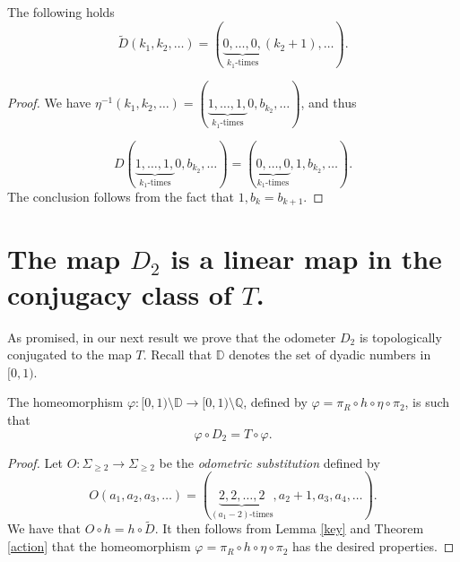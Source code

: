 \documentclass[letterpaper,10pt,reqno]{amsart}
\numberwithin{equation}{section}     %
\def\phi{\varphi}
\def\Q{{\mathbb Q}}
\begin{document}
 \begin{lemma}  \label{key}
 The following holds
 \begin{equation}
\tilde{D}(k_1, k_2,  \dots)=(\underbrace{0,\dots,0,}_{k_1\textrm{-times}}(k_2+1), \dots).
 \end{equation}
  \end{lemma}
\begin{proof}
We have $\eta^{-1}(k_1, k_2, \dots)=(\underbrace{1,\dots, 1,}_{k_1\textrm{-times}}0, b_{k_2}, \dots)$, and thus 

\[
D\left(\underbrace{1,\dots, 1,}_{k_1\textrm{-times}}0, b_{k_2},\dots \right)=\left( \underbrace{0,\dots, 0}_{k_1\textrm{-times}},1,b_{k_2},\dots\right).
\]
The conclusion follows from the fact that $1, b_k=b_{k+1}$.
\end{proof}






 
 
 
 
\section{The map $D_2$ is a linear map in the conjugacy class of $T$.} \label{sec:conj}


As promised, in our next result we prove that the odometer $D_2$ is topologically conjugated to the map $T$.
Recall that  $\mathbb{D}$ denotes  the set of dyadic numbers in $[0,1)$.

\begin{theorem} \label{main}
The {{}{homeomorphism}} $\phi:[0,1) \setminus \mathbb{D} \to [0,1) \setminus \Q$, defined by $\phi = \pi_R \circ h \circ \eta\circ \pi_2$, is such  that 
\begin{equation}
\phi \circ D_2= T \circ \phi.
\end{equation}
\end{theorem}  
 
 \begin{proof}
 Let $O: \Sigma_{\geq 2} \to \Sigma_{\geq 2}$ be the \emph{odometric substitution} defined by
 \begin{equation*}
O(a_1, a_2, a_3, \dots)= (\underbrace{2,2,\dots,2}_{(a_1-2)\textrm{-times}}, a_2+ 1, a_3, a_4, \dots).
\end{equation*} 
We have that $O \circ h =h \circ \tilde{D}$. It then follows from Lemma \ref{key} and Theorem  \ref{action} that 
the {{}{homeomorphism}} $\phi= \pi_R \circ h \circ \eta\circ \pi_2$ has the desired properties.
\end{proof}
\end{document}
